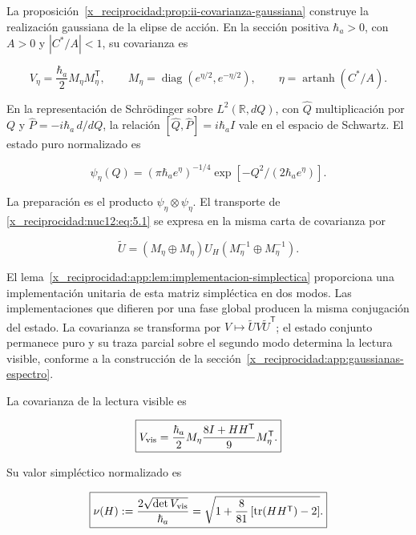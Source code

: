 La proposición~\ref{x_reciprocidad:prop:ii-covarianza-gaussiana} construye la realización gaussiana de la elipse de acción. En la sección positiva \(\hbar_a>0\), con \(A>0\) y \(|C^*/A|<1\), su covarianza es



\begin{equation}
V_\eta=\frac{\hbar_a}{2}M_\eta M_\eta^{\mathsf T},\qquad
M_\eta=\operatorname{diag}(e^{\eta/2},e^{-\eta/2}),\qquad
\eta=\operatorname{artanh}(C^*/A).
\label{x_reciprocidad:nuc12:eq:5.4}
\end{equation}



En la representación de Schrödinger sobre \(L^2(\mathbb R,dQ)\), con \(\widehat Q\) multiplicación por \(Q\) y \(\widehat P=-i\hbar_a\,d/dQ\), la relación \([\widehat Q,\widehat P]=i\hbar_a I\) vale en el espacio de Schwartz. El estado puro normalizado es



\[
\psi_\eta(Q)=(\pi\hbar_a e^\eta)^{-1/4}
\exp[-Q^2/(2\hbar_a e^\eta)].
\]



La preparación es el producto \(\psi_\eta\otimes\psi_\eta\). El transporte de \eqref{x_reciprocidad:nuc12:eq:5.1} se expresa en la misma carta de covarianza por



\begin{equation}
\widetilde U=(M_\eta\oplus M_\eta)U_H
(M_\eta^{-1}\oplus M_\eta^{-1}).
\label{x_reciprocidad:nuc12:eq:5.5}
\end{equation}



El lema~\ref{x_reciprocidad:app:lem:implementacion-simplectica} proporciona una implementación unitaria de esta matriz simpléctica en dos modos. Las implementaciones que difieren por una fase global producen la misma conjugación del estado. La covarianza se transforma por \(V\mapsto\widetilde U V\widetilde U^{\mathsf T}\); el estado conjunto permanece puro y su traza parcial sobre el segundo modo determina la lectura visible, conforme a la construcción de la sección~\ref{x_reciprocidad:app:gaussianas-espectro}.

\begin{theorem}

La covarianza de la lectura visible es



\begin{equation}
\boxed{V_{\rm vis}=
\frac{\hbar_a}{2}M_\eta
\frac{8I+HH^{\mathsf T}}9
M_\eta^{\mathsf T}.}
\label{x_reciprocidad:nuc12:eq:5.6}
\end{equation}



Su valor simpléctico normalizado es



\begin{equation}
\boxed{\nu(H):=\frac{2\sqrt{\det V_{\rm vis}}}{\hbar_a}
=\sqrt{1+\frac8{81}\left[\operatorname{tr}(HH^{\mathsf T})-2\right]}.}
\label{x_reciprocidad:nuc12:eq:5.7}
\end{equation}
\end{theorem}



